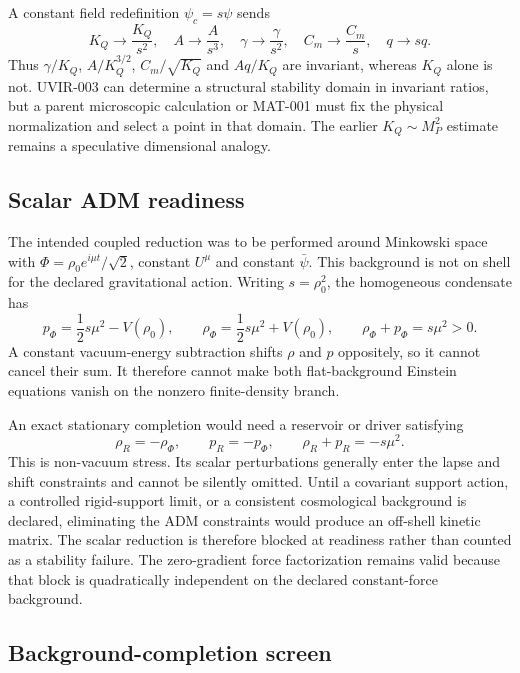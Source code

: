 A constant field redefinition $\psi_c=s\psi$ sends
\begin{equation}
 K_Q\to\frac{K_Q}{s^2},\quad
 A\to\frac{A}{s^3},\quad
 \gamma\to\frac{\gamma}{s^2},\quad
 C_m\to\frac{C_m}{s},\quad q\to sq.
\end{equation}
Thus $\gamma/K_Q$, $A/K_Q^{3/2}$, $C_m/\sqrt{K_Q}$ and $Aq/K_Q$ are invariant,
whereas $K_Q$ alone is not.  UVIR-003 can determine a structural stability
domain in invariant ratios, but a parent microscopic calculation or MAT-001
must fix the physical normalization and select a point in that domain.  The
earlier $K_Q\sim M_P^2$ estimate remains a speculative dimensional analogy.
\subsection{Scalar ADM readiness}

The intended coupled reduction was to be performed around Minkowski space
with $\Phi=\rho_0e^{i\mu t}/\sqrt2$, constant $U^\mu$ and constant
$\bar\psi$.  This background is not on shell for the declared gravitational
action.  Writing $s=\rho_0^2$, the homogeneous condensate has
\begin{equation}
 p_\Phi=\frac12s\mu^2-V(\rho_0),\qquad
 \rho_\Phi=\frac12s\mu^2+V(\rho_0),\qquad
 \rho_\Phi+p_\Phi=s\mu^2>0.
 \label{eq:condensate-enthalpy}
\end{equation}
A constant vacuum-energy subtraction shifts $\rho$ and $p$ oppositely, so it
cannot cancel their sum.  It therefore cannot make both flat-background
Einstein equations vanish on the nonzero finite-density branch.

An exact stationary completion would need a reservoir or driver satisfying
\begin{equation}
 \rho_R=-\rho_\Phi,\qquad p_R=-p_\Phi,\qquad
 \rho_R+p_R=-s\mu^2.
 \label{eq:required-support-stress}
\end{equation}
This is non-vacuum stress.  Its scalar perturbations generally enter the
lapse and shift constraints and cannot be silently omitted.  Until a
covariant support action, a controlled rigid-support limit, or a consistent
cosmological background is declared, eliminating the ADM constraints would
produce an off-shell kinetic matrix.  The scalar reduction is therefore
blocked at readiness rather than counted as a stability failure.  The
zero-gradient force factorization remains valid because that block is
quadratically independent on the declared constant-force background.

\subsection{Background-completion screen}

